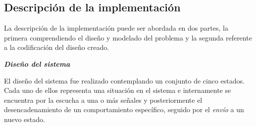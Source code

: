 \documentclass[journal]{IEEEtran}
\begin{document}
\subsection{Descripción de la implementación}
\label{sub:metodologia-modelado-statechart}

La descripción de la implementación puede ser abordada en dos partes, la primera comprendiendo el diseño y modelado del problema y la segunda referente a la codificación del diseño creado.

\vspace{0.5cm}
\textbf{\emph{Diseño del sistema}}

El diseño del sistema fue realizado contemplando un conjunto de cinco estados.
Cada uno de ellos representa una situación en el sistema e internamente se encuentra por la escucha a una o más señales y posteriormente el desencadenamiento de un comportamiento específico, seguido por el \emph{envío} a un nuevo estado.
\end{document}
